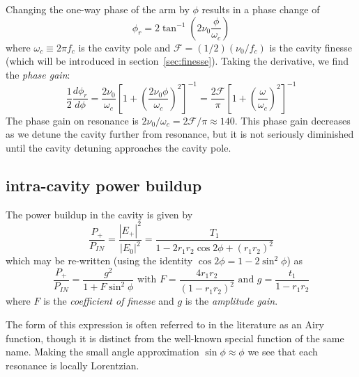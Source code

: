 Changing the one-way phase of the arm by $\phi$ results in a phase 
change of
\begin{equation}
\phi_r   = 2 \tan^{-1} \left( 2 \nu_0 \frac{\phi}{\omega_c} \right)
\end{equation}
where $\omega_c\equiv2\pi f_c$ is the cavity pole and $\mathcal{F}=(1/2)(\nu_0/f_c)$ is the cavity finesse (which will be introduced in section~\ref{sec:finesse}).  Taking the derivative, we find the \emph{phase gain}:
\begin{equation}
  \frac{1}{2} \frac{d \phi_r}{d \phi} 
= \frac{2 \nu_0}{\omega_c} \left[1 + \left(\frac{2 \nu_0 \phi}{\omega_c}\right)^2 \right]^{-1} 
= \frac{2 \mathcal{F}}{\pi} \left[1 + \left(\frac{\omega}{\omega_c}\right)^2 \right]^{-1} 
\end{equation}
The phase gain on resonance is $2 \nu_0 / \omega_c = 2\mathcal{F}/\pi \approx 140$. This phase gain decreases as we detune the cavity further from resonance, but it is not seriously diminished until the cavity detuning approaches the cavity pole.

\subsection{intra-cavity power buildup}

The power buildup in the cavity is given by 
\begin{equation}
\frac{P_+}{P_{IN}} = \frac{|E_+|^2}{|E_0|^2} = \frac{ T_1}{1 - 2 r_1 r_2 \cos 2\phi+\left(r_1 r_2\right)^2 }
\end{equation} 
which may be re-written (using the identity $\cos2\phi = 1 -
2\sin^2\phi$) as
\begin{equation}
\label{cavity_buildup_eq}
\frac{P_+}{P_{IN}} = \frac{g^2}{1 + F \sin^2 \phi} 
\text{  with  } F = \frac{4 r_1 r_2}{(1 - r_1 r_2)^2}
\text{  and  } g = \frac{t_1}{1-r_1 r_2}
\end{equation} 
where $F$ is the \emph{coefficient of finesse} and $g$ is the
\emph{amplitude gain}.

The form of this expression is often referred to in the literature as
an Airy function, though it is distinct from the well-known special
function of the same name.  Making the small angle approximation
$\sin\phi\approx\phi$ we see that each resonance is locally Lorentzian.

